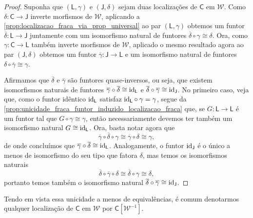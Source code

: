 \begin{proof}
  Suponha que $(\mathsf{L},\gamma)$ e $(\mathsf{J},\delta)$ sejam duas localizações de $\mathsf{C}$ em $\mathcal{W}$.
  Como $\delta: \mathsf{C} \to \mathsf{J}$ inverte morfismos de $\mathcal{W}$, aplicando a \cref{prop:localizacao_fraca_via_prop_universal} ao par $(\mathsf{L},\gamma)$ obtemos um funtor $\overline{\delta}: \mathsf{L} \to \mathsf{J}$ juntamente com um isomorfismo natural de funtores $\overline{\delta} \circ \gamma \cong \delta$.
  Ora, como $\gamma: \mathsf{C} \to \mathsf{L}$ também inverte morfismos de $\mathcal{W}$, aplicado o mesmo resultado agora ao par $(\mathsf{J},\delta)$ obtemos um funtor $\overline{\gamma}: \mathsf{J} \to \mathsf{L}$ e um isomorfismo natural de funtores $\delta \circ \overline{\gamma} \cong \gamma$.

  Afirmamos que $\overline{\delta}$ e $\overline{\gamma}$ são funtores quase-inversos, ou seja, que existem isomorfismos naturais de funtores $\overline{\gamma} \circ \overline{\delta} \cong \mathrm{id}_{\mathsf{L}}$ e $\overline{\delta} \circ \overline{\gamma} \cong \mathrm{id}_{\mathsf{J}}$.
  No primeiro caso, veja que, como o funtor idêntico $\mathrm{id}_{\mathsf{L}}$ satisfaz $\mathrm{id}_{\mathsf{L}} \circ \gamma = \gamma$, segue da \cref{prop:unicidade_fraca_funtor_induzido_localizacao_fraca} que, se $G: \mathsf{L} \to \mathsf{L}$ é um funtor tal que $G \circ \gamma \cong \gamma$, então necessariamente devemos ter também um isomorfismo natural $G \cong \mathrm{id}_{\mathsf{L}}$.
  Ora, basta notar agora que
  \begin{displaymath}
    \overline{\gamma} \circ \overline{\delta} \circ \gamma \cong \overline{\gamma} \circ \delta \cong \gamma,
  \end{displaymath}
  de onde concluímos que $\overline{\gamma} \circ \overline{\delta} \cong \mathrm{id}_{\mathsf{L}}$.
  Analogamente, o funtor $\mathrm{id}_{\mathsf{J}}$ é o único a menos de isomorfismo do seu tipo que fatora $\delta$, mas temos os isomorfismos naturais
  \begin{displaymath}
    \overline{\delta} \circ \overline{\gamma} \circ \delta \cong \overline{\delta} \circ \gamma \cong \delta,
  \end{displaymath}
  portanto temos também o isomorfismo natural $\overline{\delta} \circ \overline{\gamma} \cong \mathrm{id}_{\mathsf{J}}$.
\end{proof}

Tendo em vista essa unicidade a menos de equivalências, é comum denotarmos qualquer localização de $\mathsf{C}$ em $\mathcal{W}$ por $\mathsf{C}[\mathcal{W}^{-1}]$.

